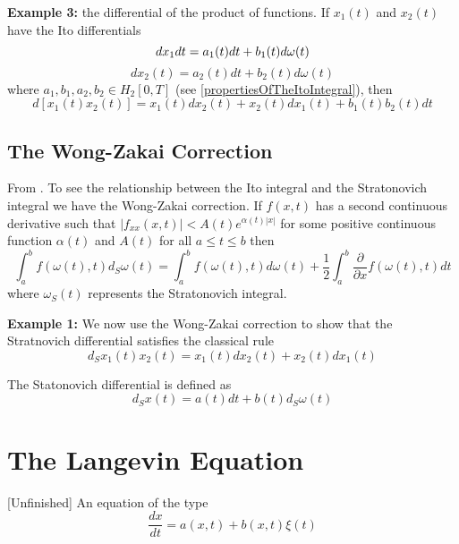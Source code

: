\documentclass[12pt]{report}
\begin{document}
\textbf{Example 3:} the differential of the product of functions. If $x_1(t)$ and $x_2(t)$ have the Ito differentials
\begin{equation*}
dx_1dt = a_1(t)dt +b_1(t)d\omega(t)\\
\end{equation*}
\begin{equation*}
dx_2(t) =a_2(t)dt+b_2(t)d\omega(t) 
\end{equation*}
where $a_1,b_1,a_2,b_2\in H_2[0,T]$ (see \ref{propertiesOfTheItoIntegral}), then
\begin{equation*}
d[x_1(t)x_2(t)]= x_1(t)dx_2(t)+x_2(t)dx_1(t)+b_1(t)b_2(t)dt
\end{equation*}

\subsection{The Wong-Zakai Correction}
From \cite{schuss2009theory}. To see the relationship between the Ito integral and the Stratonovich integral we have the Wong-Zakai correction.  If $f(x,t)$ has a second continuous derivative such that $|f_{xx}(x,t)|<A(t)e^{\alpha(t)|x|} $ for some positive continuous function $\alpha(t)$ and $A(t)$ for all $a\leq t \leq b$ then
\begin{equation}
\int_{a}^b f(\omega(t),t)d_S\omega(t) = \int_a^b f(\omega(t),t)d\omega(t)+\frac{1}{2}\int_a^b\frac{\partial}{\partial x}f(\omega(t),t)dt
\end{equation}
where $\omega_S(t)$ represents the Stratonovich integral.

\textbf{Example 1:} We now use the Wong-Zakai correction to show that the Stratnovich differential satisfies the classical rule
\begin{equation*}
d_Sx_1(t)x_2(t)= x_1(t)dx_2(t) +x_2(t)dx_1(t)
\end{equation*}

The Statonovich differential is defined as 
\begin{equation*}
d_Sx(t) = a(t)dt+b(t)d_S\omega(t)
\end{equation*}



\section{The Langevin Equation}{[Unfinished]}
An equation of the type 
\begin{equation*}
\frac{dx}{dt}=a(x,t)+b(x,t)\xi(t)
\end{equation*}
\end{document}
